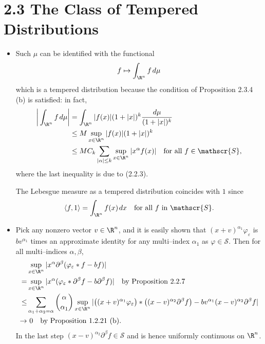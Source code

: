 \section*{2.3 The Class of Tempered Distributions}
\begin{itemize}
\item[2.3.1]

Such $\mu$ can be identified with the functional
$$f\mapsto \int_{\R^n}f\>d\mu$$
which is a tempered distribution 
because the condition of Proposition 2.3.4 (b) is satisfied: in fact,
\begin{align*}
\bigg|\int_{\R^n}f\>d\mu\bigg|&
=\int_{\R^n}|f(x)|(1+|x|)^k\frac{d\mu}{(1+|x|)^k}\\
&\leq M\sup_{x\in\R^n}|f(x)|(1+|x|)^k\\
&\leq MC_k\sum_{|\alpha|\leq k}\sup_{x\in\R^n}|x^\alpha f(x)|\quad\text{for all }f \in\mathscr{S},
\end{align*}
where the last inequality is due to (2.2.3).

The Lebesgue measure as a tempered distribution coincides with $1$ since
$$\langle f,1\rangle=\int_{\R^n}f(x)\>dx\quad\text{for all }f \text{ in }\mathscr{S}.$$

\item[2.3.2]

Pick any nonzero vector $v\in\R^n$, and it is easily shown that 
$(x+v)^{\alpha_1}\varphi_\varepsilon$ is $bv^{\alpha_1}$ times an approximate 
identity for any multi--index $\alpha_1$ as $\varphi\in\mathscr{S}$. 
Then for all multi--indices $\alpha,\beta$,
\begin{align*}
    &\sup_{x\in\R^n}|x^\alpha\partial^\beta(\varphi_\varepsilon*f-bf)|\\
    =&\sup_{x\in\R^n}|x^\alpha(\varphi_\varepsilon*\partial^\beta f-b\partial^\beta f)|\quad\text{by Proposition 2.2.7}\\
    \leq&\sum_{\alpha_1+\alpha_2=\alpha}\binom{\alpha}{\alpha_1}
    \sup_{x\in\R^n}|\big((x+v)^{\alpha_1}\varphi_\varepsilon\big)*\big((x-v)^{\alpha_2}\partial^\beta f\big)-bv^{\alpha_1}(x-v)^{\alpha_2}\partial^\beta f|\\
    \rightarrow&\ 0\quad\text{by Proposition 1.2.21 (b)}.
\end{align*}
In the last step $(x-v)^{\alpha_2}\partial^\beta f\in\mathscr{S}$ 
and is hence uniformly continuous on $\R^n$.


\end{itemize}
